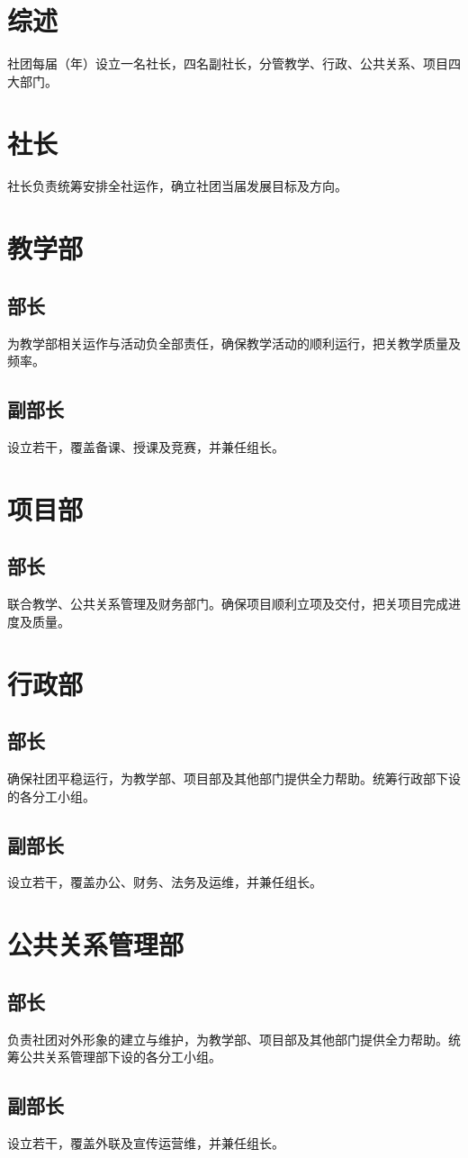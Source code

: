 \section{综述}
社团每届（年）设立一名社长，四名副社长，分管教学、行政、公共关系、项目四大部门。



\section{社长}
社长负责统筹安排全社运作，确立社团当届发展目标及方向。



\section{教学部}
    \subsection{部长}
    为教学部相关运作与活动负全部责任，确保教学活动的顺利运行，把关教学质量及频率。


    \subsection{副部长}
    设立若干，覆盖备课、授课及竞赛，并兼任组长。



\section{项目部}
    \subsection{部长}
    联合教学、公共关系管理及财务部门。确保项目顺利立项及交付，把关项目完成进度及质量。



\section{行政部}
    \subsection{部长}
    确保社团平稳运行，为教学部、项目部及其他部门提供全力帮助。统筹行政部下设的各分工小组。


    \subsection{副部长}
    设立若干，覆盖办公、财务、法务及运维，并兼任组长。



\section{公共关系管理部}
    \subsection{部长}
    负责社团对外形象的建立与维护，为教学部、项目部及其他部门提供全力帮助。统筹公共关系管理部下设的各分工小组。


    \subsection{副部长}
    设立若干，覆盖外联及宣传运营维，并兼任组长。
